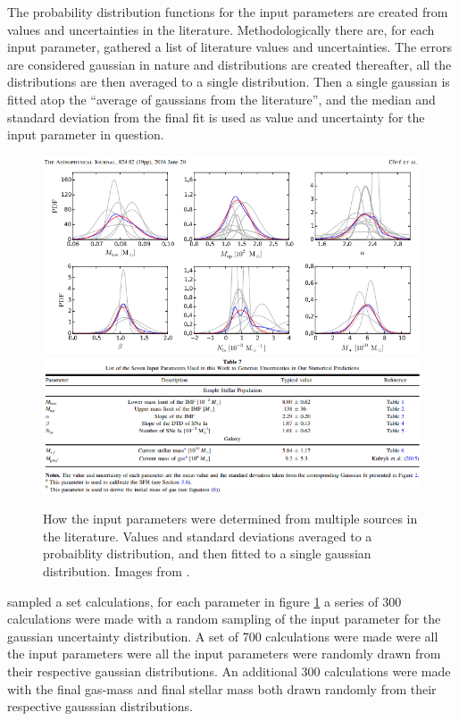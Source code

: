 The probability distribution functions for the input parameters are created from values and uncertainties in the literature.
Methodologically there are, for each input parameter, gathered a list of literature values and uncertainties.
The errors are considered gaussian in nature and distributions are created thereafter,
all the distributions are then averaged to a single distribution.
Then a single gaussian is fitted atop the ``average of gaussians from the literature'',
and the median and standard deviation from
the final fit is used as value and uncertainty for the input parameter in question.

\setlength{\subfigwidth}{\linewidth}
\begin{figure}
  \centering
  \includegraphics[width=\subfigwidth]{img/parameter_pdfs_cote16a_fig2.png}
  \includegraphics[width=\subfigwidth]{img/parameter_table_cote16a_table7.png}
  \caption{\label{fig:cote16-input-param}
    How the input parameters were determined from multiple sources in the literature. Values and standard deviations averaged to a probaiblity distribution, and then fitted to a single gaussian distribution. Images from .
  }
\end{figure}

 sampled a set calculations, for each parameter in figure \ref{fig:cote16-input-param} a series of 300 calculations were made with a random sampling of the input parameter for the gaussian uncertainty distribution.
A set of 700 calculations were made were all the input parameters were all the input parameters were randomly drawn from their respective gaussian distributions. An additional 300 calculations were made with the final gas-mass and final stellar mass both drawn randomly from their respective gausssian distributions.

